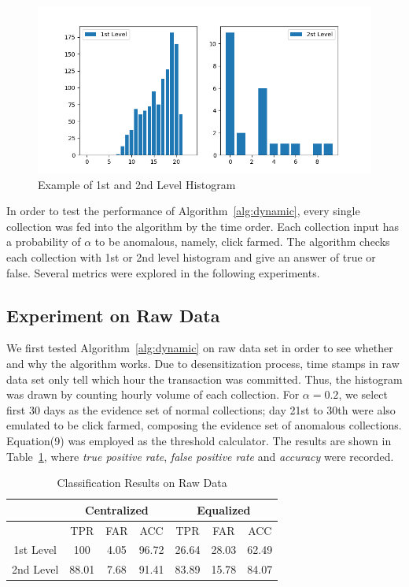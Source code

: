 \documentclass[a4paper]{IEEEtran}
\begin{document}
			\begin{figure}[!ht]
				\centering
				\includegraphics[width=\linewidth]{fig/HistogramExample.png}
				\caption{Example of 1st and 2nd Level Histogram}
				\label{fig:histogram-example}
			\end{figure}
			
			In order to test the performance of Algorithm~\ref{alg:dynamic}, every single collection was fed into the algorithm by the time order. Each collection input has a probability of $\alpha$ to be anomalous, namely, click farmed. The algorithm checks each collection with 1st or 2nd level histogram and give an answer of true or false. Several metrics were explored in the following experiments.
			
		\subsection{Experiment on Raw Data}\label{sec:exp-raw}
			We first tested Algorithm~\ref{alg:dynamic} on raw data set in order to see whether and why the algorithm works. Due to desensitization process, time stamps in raw data set only tell which hour the transaction was committed. Thus, the histogram was drawn by counting hourly volume of each collection. For $\alpha = 0.2$, we select first 30 days as the evidence set of normal collections; day 21st to 30th were also emulated to be click farmed, composing the evidence set of anomalous collections. Equation(9) was employed as the threshold calculator. The results are shown in Table~\ref{tab:result-raw-1st}, where \textit{true positive rate}, \textit{false positive rate} and \textit{accuracy} were recorded.
			
			\begin{table}[!ht]
				\centering
				\caption{Classification Results on Raw Data}
				\label{tab:result-raw-1st}
				\begin{tabular}{|c|c|c|c|c|c|c|}
					\hline
					& \multicolumn{3}{c|}{Centralized} & \multicolumn{3}{c|}{Equalized}\\
					\hline
					& TPR & FAR & ACC & TPR & FAR & ACC\\
					\hline
					1st Level & 100 & 4.05 & 96.72 & 26.64 & 28.03 & 62.49\\
					\hline
					2nd Level & 88.01 & 7.68 & 91.41 & 83.89 & 15.78 & 84.07\\
					\hline
				\end{tabular}
			\end{table}
			
\end{document}
